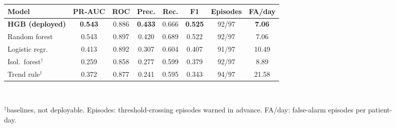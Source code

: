 \documentclass[10pt,a4paper]{article}
\begin{document}
\begin{figure}[!htb]
\begin{minipage}[c]{0.5\textwidth}
\centering\footnotesize
{}
\label{tab:models}
\setlength{\tabcolsep}{2.3pt}
\begin{tabular}{@{}lccccccc@{}}
\toprule
Model & PR-AUC & ROC & Prec. & Rec. & F1 & Episodes & FA/day\\
\midrule
\textbf{HGB (deployed)} & \textbf{0.543} & 0.886 & \textbf{0.433} & 0.666 & \textbf{0.525} & 92/97 & \textbf{7.06}\\
Random forest & 0.543 & 0.897 & 0.420 & 0.689 & 0.522 & 92/97 & 7.06\\
Logistic regr. & 0.413 & 0.892 & 0.307 & 0.604 & 0.407 & 91/97 & 10.49\\
Isol.\ forest$^\dagger$ & 0.259 & 0.858 & 0.277 & 0.599 & 0.379 & 92/97 & 8.89\\
Trend rule$^\dagger$ & 0.372 & 0.877 & 0.241 & 0.595 & 0.343 & 94/97 & 21.58\\
\bottomrule
\end{tabular}\\[2pt]
\parbox{\linewidth}{\scriptsize $^\dagger$baselines, not deployable. Episodes: threshold-crossing episodes warned in advance. FA/day: false-alarm episodes per patient-day.}
\end{minipage}\hfill
\begin{minipage}[c]{0.47\textwidth}
\centering

\label{fig:curves}
\end{minipage}
\end{figure}
\end{document}
